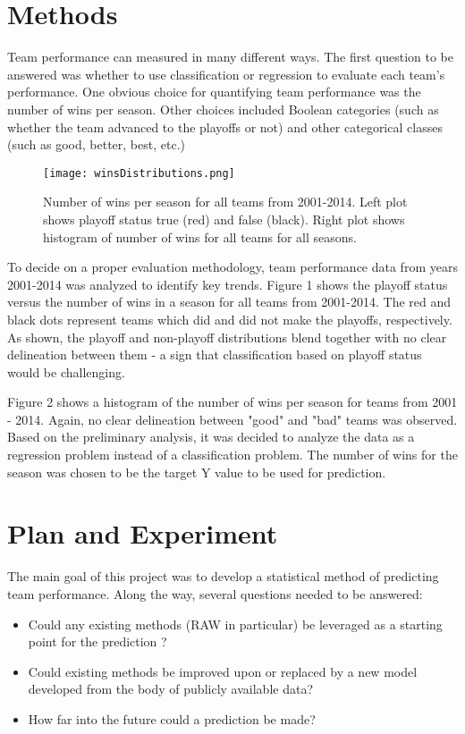 \documentclass{article} %
\begin{document}
\section{Methods}
Team performance can measured in many different ways. The first question to be answered was whether to use classification or regression to evaluate each team's performance. One obvious choice for quantifying team performance was the number of wins per season.  Other choices included Boolean categories (such as whether the team advanced to the playoffs or not) and other categorical classes (such as good, better, best, etc.) 

\begin{figure}[ht!]
\centering
\texttt{[image: winsDistributions.png]}
\caption{Number of wins per season for all teams from 2001-2014. Left plot shows playoff status true (red) and false (black).  Right plot shows histogram of number of wins for all teams for all seasons.\label{overflow}}
\end{figure}


To decide on a proper evaluation methodology, team performance data from years 2001-2014 was analyzed to identify key trends.  Figure 1 shows the  playoff status versus the number of wins in a season for all teams from 2001-2014. The red and black dots represent teams which did and did not make the playoffs, respectively.  As shown, the playoff and non-playoff distributions blend together with no clear delineation between them - a sign that classification based on playoff status would be challenging.  

Figure 2 shows a histogram of the number of wins per season for teams from 2001 - 2014.  Again, no clear delineation between "good" and "bad" teams was observed.  Based on the preliminary analysis, it was decided to analyze the data as a regression problem instead of a classification problem.  The number of wins for the season was chosen to be the target Y value to be used for prediction.

\section{Plan and Experiment}
The main goal of this project was to develop a statistical method of predicting team performance.  Along the way, several questions needed to be answered:

\begin{itemize}  
\item Could any existing methods (RAW in particular) be leveraged as a starting point for the prediction ?
\item Could existing methods be improved upon or replaced by a new model developed from the body of publicly available data?
\item How far into the future could a prediction be made?
\end{itemize}
\end{document}
